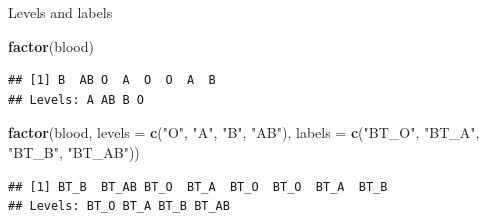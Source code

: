 \documentclass[ignorenonframetext,]{beamer}
\newenvironment{Shaded}{\begin{snugshade}}{\end{snugshade}}
\newcommand{\DataTypeTok}[1]{\textcolor[rgb]{0.13,0.29,0.53}{#1}}
\newcommand{\KeywordTok}[1]{\textcolor[rgb]{0.13,0.29,0.53}{\textbf{#1}}}
\newcommand{\NormalTok}[1]{#1}
\newcommand{\StringTok}[1]{\textcolor[rgb]{0.31,0.60,0.02}{#1}}
\begin{document}
\begin{frame}[fragile]{Levels and labels}
\protect\hypertarget{levels-and-labels-2}{}

\begin{Shaded}
\begin{Highlighting}[]
\KeywordTok{factor}\NormalTok{(blood)}
\end{Highlighting}
\end{Shaded}

\begin{verbatim}
## [1] B  AB O  A  O  O  A  B 
## Levels: A AB B O
\end{verbatim}

\begin{Shaded}
\begin{Highlighting}[]
\KeywordTok{factor}\NormalTok{(blood,}
         \DataTypeTok{levels =} \KeywordTok{c}\NormalTok{(}\StringTok{"O"}\NormalTok{, }\StringTok{"A"}\NormalTok{, }\StringTok{"B"}\NormalTok{, }\StringTok{"AB"}\NormalTok{),}
         \DataTypeTok{labels =} \KeywordTok{c}\NormalTok{(}\StringTok{"BT_O"}\NormalTok{, }\StringTok{"BT_A"}\NormalTok{, }\StringTok{"BT_B"}\NormalTok{, }\StringTok{"BT_AB"}\NormalTok{))}
\end{Highlighting}
\end{Shaded}

\begin{verbatim}
## [1] BT_B  BT_AB BT_O  BT_A  BT_O  BT_O  BT_A  BT_B 
## Levels: BT_O BT_A BT_B BT_AB
\end{verbatim}

\end{frame}
\end{document}
